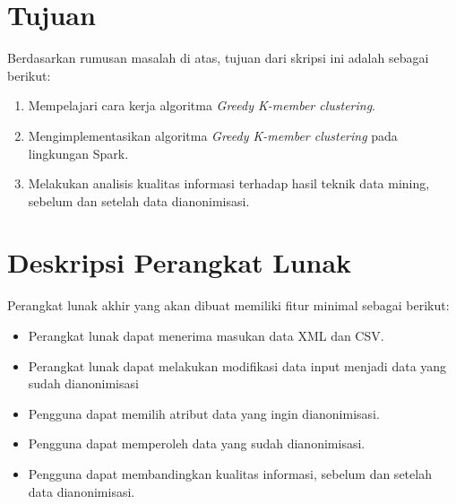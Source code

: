 \documentclass[a4paper,twoside]{article}
\begin{document}
\section{Tujuan}
Berdasarkan rumusan masalah di atas, tujuan dari skripsi ini adalah sebagai berikut:
\begin{enumerate}
	\item Mempelajari cara kerja algoritma {\it Greedy K-member clustering}.
	\item Mengimplementasikan algoritma {\it Greedy K-member clustering } pada lingkungan Spark.
	\item Melakukan analisis kualitas informasi terhadap hasil teknik data mining, sebelum dan setelah data dianonimisasi.
\end{enumerate}

\section{Deskripsi Perangkat Lunak}
Perangkat lunak akhir yang akan dibuat memiliki fitur minimal sebagai berikut:
\begin{itemize}
	\item Perangkat lunak dapat menerima masukan data XML dan CSV.
	\item Perangkat lunak dapat melakukan modifikasi data input menjadi data yang sudah dianonimisasi  
	\item Pengguna dapat memilih atribut data yang ingin dianonimisasi.
	\item Pengguna dapat memperoleh data yang sudah dianonimisasi.
	\item Pengguna dapat membandingkan kualitas informasi, sebelum dan setelah data dianonimisasi.
\end{itemize}
\end{document}
